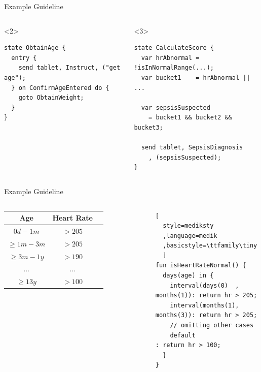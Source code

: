 \documentclass{beamer}
\begin{document}
\begin{frame}[fragile]{Example \MediK{} Guideline}
  \begin{columns}
      
    \begin{onlyenv}<2>
      \begin{lstlisting}[language=medik, style=mediksty, basicstyle=\ttfamily\tiny]
state ObtainAge {
  entry {
    send tablet, Instruct, ("get age");
  } on ConfirmAgeEntered do {
    goto ObtainWeight;
  }
}
    \end{lstlisting}
    \end{onlyenv}
    \begin{onlyenv}<3>
      \begin{lstlisting}[language=medik, style=mediksty, basicstyle=\ttfamily\tiny]
state CalculateScore {
  var hrAbnormal = !isInNormalRange(...);
  var bucket1    = hrAbnormal || ...

  var sepsisSuspected
    = bucket1 && bucket2 && bucket3;

  send tablet, SepsisDiagnosis
    , (sepsisSuspected);
}
      \end{lstlisting}
    \end{onlyenv}
  \end{columns}
\end{frame}

\begin{frame}[fragile]{Example \MediK{} Guideline}
  \begin{columns}
    \tiny
    \begin{tabular}{ | c || c | c | }
      \hline
      \textbf{Age}            & \textbf{Heart Rate} \\
      \hline
      $0d - 1m$               & $>205$              \\
      \hline
      $\geq 1m - 3m$          & $>205$              \\
      \hline
      $\geq 3m - 1y$          & $>190$              \\
      \hline
      $\dots$                 & $\dots$             \\
      \hline
      $\geq 13y$              & $>100$              \\
      \hline
    \end{tabular}
\begin{lstlisting}[
  style=mediksty
  ,language=medik
  ,basicstyle=\ttfamily\tiny
  ]
fun isHeartRateNormal() {
  days(age) in {
    interval(days(0)  , months(1)): return hr > 205;
    interval(months(1), months(3)): return hr > 205;
    // omitting other cases
    default                       : return hr > 100;
  }
}
\end{lstlisting}
  \end{columns}
\end{frame}
\end{document}
